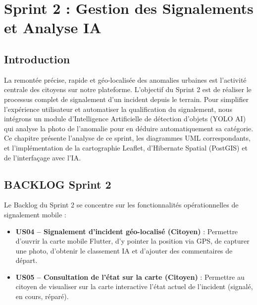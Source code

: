 
\chapter[Sprint 2 : Signalements et IA]{Sprint 2 : Gestion des Signalements et Analyse IA}

\section*{Introduction}
La remontée précise, rapide et géo-localisée des anomalies urbaines est l'activité centrale des citoyens sur notre plateforme. L'objectif du Sprint 2 est de réaliser le processus complet de signalement d'un incident depuis le terrain. Pour simplifier l'expérience utilisateur et automatiser la qualification du signalement, nous intégrons un module d'Intelligence Artificielle de détection d'objets (YOLO AI) qui analyse la photo de l'anomalie pour en déduire automatiquement sa catégorie. Ce chapitre présente l'analyse de ce sprint, les diagrammes UML correspondants, et l'implémentation de la cartographie Leaflet, d'Hibernate Spatial (PostGIS) et de l'interfaçage avec l'IA.

\section{BACKLOG Sprint 2}
Le Backlog du Sprint 2 se concentre sur les fonctionnalités opérationnelles de signalement mobile :
\begin{itemize}
    \item \textbf{US04 -- Signalement d'incident géo-localisé (Citoyen)} : Permettre d'ouvrir la carte mobile Flutter, d'y pointer la position via GPS, de capturer une photo, d'obtenir le classement IA et d'ajouter des commentaires de départ.
    \item \textbf{US05 -- Consultation de l'état sur la carte (Citoyen)} : Permettre au citoyen de visualiser sur la carte interactive l'état actuel de l'incident (signalé, en cours, réparé).
\end{itemize}

